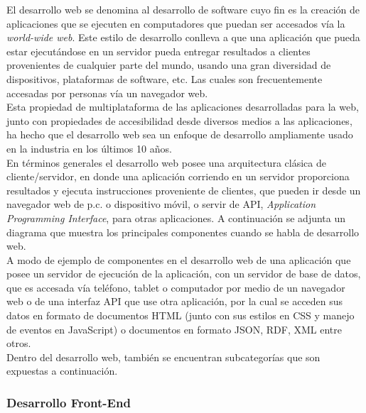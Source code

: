 El desarrollo web se denomina al desarrollo de software cuyo fin es la creación de aplicaciones que se ejecuten en computadores que puedan ser accesados vía la \emph{world-wide web}. Este estilo de desarrollo conlleva a que una aplicación que pueda estar ejecutándose en un servidor pueda entregar resultados a clientes provenientes de cualquier parte del mundo, usando una gran diversidad de dispositivos, plataformas de software, etc. Las cuales son frecuentemente accesadas por personas vía un navegador web.\\

Esta propiedad de multiplataforma de las aplicaciones desarrolladas para la web, junto con propiedades de accesibilidad desde diversos medios a las aplicaciones, ha hecho que el desarrollo web sea un enfoque de desarrollo ampliamente usado en la industria en los últimos 10 años.\\

En términos generales el desarrollo web posee una arquitectura clásica de cliente/servidor, en donde una aplicación corriendo en un servidor proporciona resultados y ejecuta instrucciones proveniente de clientes, que pueden ir desde un navegador web de p.c. o dispositivo móvil, o servir de API, \emph{Application Programming Interface}, para otras aplicaciones. A continuación se adjunta un diagrama que muestra los principales componentes cuando se habla de desarrollo web.\\

A modo de ejemplo de componentes en el desarrollo web de una aplicación que posee un servidor de ejecución de la aplicación, con un servidor de base de datos, que es accesada vía teléfono, tablet o computador por medio de un navegador web o de una interfaz API que use otra aplicación, por la cual se acceden sus datos en formato de documentos HTML (junto con sus estilos en CSS y manejo de eventos en JavaScript) o documentos en formato JSON, RDF, XML entre otros.\\

Dentro del desarrollo web, también se encuentran subcategorías que son expuestas a continuación.

\subsubsection{Desarrollo Front-End} %
\label{ssub:desarrollo_front_end}

